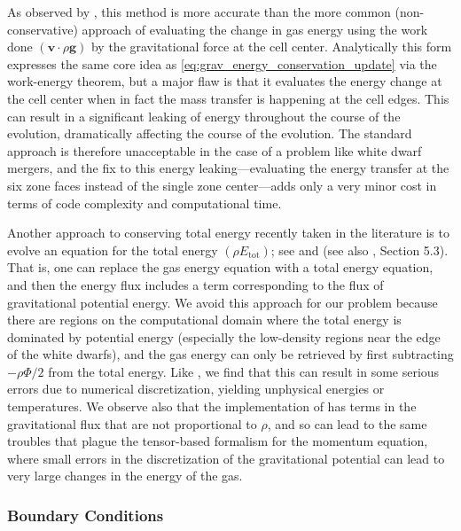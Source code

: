 \documentclass[iop,numberedappendix]{../emulateapj}
\begin{document}
As observed by \cite{arepo}, this method is more accurate than the more common (non-conservative) approach
of evaluating the change in gas energy using the work done $(\mathbf{v} \cdot \rho \mathbf{g})$
by the gravitational force at the cell center. Analytically this form expresses the same core idea as
\autoref{eq:grav_energy_conservation_update} via the work-energy theorem, but a major flaw is that
it evaluates the energy change at the cell center when in fact the mass transfer is happening at
the cell edges. This can result in a significant leaking of energy throughout the course of the
evolution, dramatically affecting the course of the evolution. The standard approach is therefore
unacceptable in the case of a problem like white dwarf mergers, and the fix to this energy
leaking---evaluating the energy transfer at the six zone faces instead of the single zone
center---adds only a very minor cost in terms of code complexity and computational time.

Another approach to conserving total energy recently taken in the literature is to evolve an 
equation for the total energy $(\rho E_{\text{tot}})$; see \cite{marcello:2012} and \cite{jiang:2013} (see also 
\cite{arepo}, Section 5.3). That is, one can replace the gas energy equation with a total energy equation, 
and then the energy flux includes a term corresponding to the flux of gravitational potential energy. We 
avoid this approach for our problem because there are regions on the computational domain where the total 
energy is dominated by potential energy (especially the low-density regions near the edge of the white dwarfs),
and the gas energy can only be retrieved by first subtracting $-\rho \Phi/2$ from the total energy. Like 
\cite{arepo}, we find that this can result in some serious errors due to numerical discretization, yielding 
unphysical energies or temperatures. We observe also that the implementation of \cite{jiang:2013} 
has terms in the gravitational flux that are not proportional to $\rho$, and so can lead to the 
same troubles that plague the tensor-based formalism for the momentum equation, where small errors 
in the discretization of the gravitational potential can lead to very large changes in the energy of the gas.

\subsubsection{Boundary Conditions}\label{sec:gravity_boundary_conditions}
\end{document}
